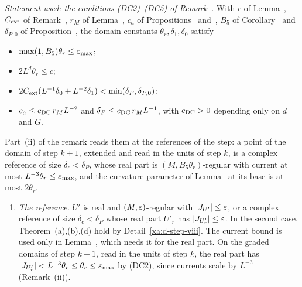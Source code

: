 \begin{detail}\label{xa:d-sq-setting}
\emph{Statement used: the conditions (DC2)--(DC5) of Remark~.} With $c$ of Lemma~, $C_{\rm ext}$ of Remark~, $r_M$ of Lemma~, $c_a$ of Propositions~ and~, $B_5$ of Corollary~ and $\delta_{P,0}$ of Proposition~, the domain constants $\theta_r,\delta_1,\delta_0$ satisfy
\begin{itemize}
\item[(DC2)] $\max(1,B_5)\theta_r\le\varepsilon_{\max}$;
\item[(DC3)] $2L^d\theta_r\le c$;
\item[(DC4)] $2C_{\rm ext}(L^{-1}\delta_0+L^{-2}\delta_1)<\min(\delta_P,\delta_{P,0})$;
\item[(DC5)] $c_a\le c_{\rm DC}\,r_ML^{-2}$ and $\delta_P\le c_{\rm DC}\,r_ML^{-1}$, with $c_{\rm DC}>0$ depending only on $d$ and $G$.
\end{itemize}
Part~(ii) of the remark reads them at the references of the step: a point of the domain of step $k+1$, extended and read in the units of step $k$, is a complex reference of size $\delta_c<\delta_P$, whose real part is $(M,B_5\theta_r)$-regular with current at most $L^{-3}\theta_r\le\varepsilon_{\max}$, and the curvature parameter of Lemma~ at its base is at most $2\theta_r$.

\begin{enumerate}[label=(\alph*)]
\item \emph{The reference.} $U'$ is real and $(M,\varepsilon)$-regular with $\lvert J_{U'}\rvert\le\varepsilon$, or a complex reference of size $\delta_c<\delta_P$ whose real part $U'_r$ has $\lvert J_{U'_r}\rvert\le\varepsilon$. In the second case, Theorem~(a),(b),(d) hold by Detail~\ref{xa:d-step-viii}. The current bound is used only in Lemma~, which needs it for the real part. On the graded domains of step $k+1$, read in the units of step $k$, the real part has $\lvert J_{U'_r}\rvert<L^{-3}\theta_r\le\theta_r\le\varepsilon_{\max}$ by (DC2), since currents scale by $L^{-3}$ (Remark~(ii)).


\end{enumerate}
\end{detail}
